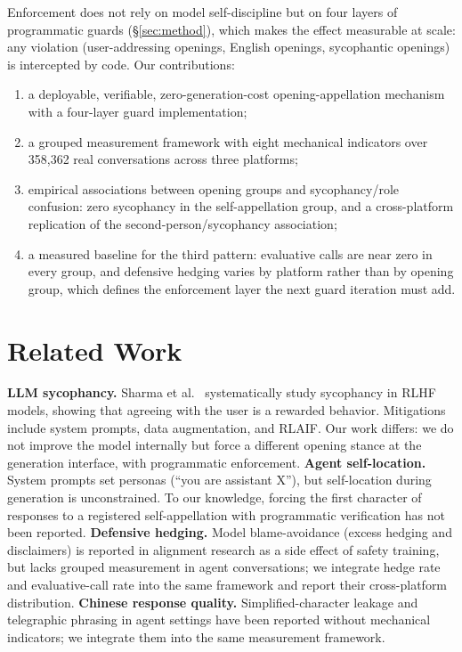\documentclass[10pt,twocolumn]{article}
\begin{document}
Enforcement does not rely on model self-discipline but on four layers of programmatic
guards (\S\ref{sec:method}), which makes the effect measurable at scale: any violation
(user-addressing openings, English openings, sycophantic openings) is intercepted by
code. Our contributions:
\begin{enumerate}
  \item a deployable, verifiable, zero-generation-cost opening-appellation mechanism
        with a four-layer guard implementation;
  \item a grouped measurement framework with eight mechanical indicators over 358{,}362
        real conversations across three platforms;
  \item empirical associations between opening groups and sycophancy/role confusion:
        zero sycophancy in the self-appellation group, and a cross-platform replication
        of the second-person/sycophancy association;
  \item a measured baseline for the third pattern: evaluative calls are near zero in
        every group, and defensive hedging varies by platform rather than by opening
        group, which defines the enforcement layer the next guard iteration must add.
\end{enumerate}

\section{Related Work}
\textbf{LLM sycophancy.} Sharma et al.\ \cite{sharma2024towards} systematically study
sycophancy in RLHF models, showing that agreeing with the user is a rewarded behavior.
Mitigations include system prompts, data augmentation, and RLAIF. Our work differs: we
do not improve the model internally but force a different opening stance at the
generation interface, with programmatic enforcement. \textbf{Agent self-location.}
System prompts set personas (``you are assistant X''), but self-location during
generation is unconstrained. To our knowledge, forcing the first character of responses
to a registered self-appellation with programmatic verification has not been reported.
\textbf{Defensive hedging.} Model blame-avoidance (excess hedging and disclaimers) is
reported in alignment research as a side effect of safety training, but lacks grouped
measurement in agent conversations; we integrate hedge rate and evaluative-call rate
into the same framework and report their cross-platform distribution.
\textbf{Chinese response quality.} Simplified-character leakage and telegraphic phrasing
in agent settings have been reported without mechanical indicators; we integrate them
into the same measurement framework.
\end{document}

